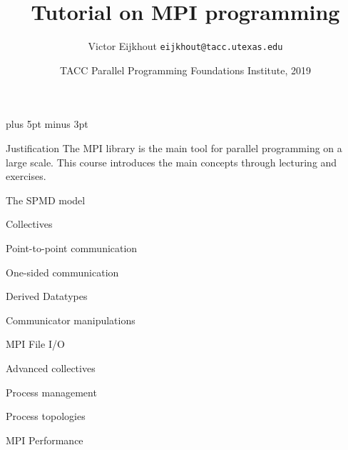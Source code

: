 \documentclass[11pt,headernav]{beamer}
\def\Location{TACC Parallel Programming Foundations Institute, 2019}
\def\TitleExtra{}
\newcounter{tacc}
\begin{document}
\parskip=10pt plus 5pt minus 3pt

\title{Tutorial on MPI programming\TitleExtra}
\author{Victor Eijkhout {\tt eijkhout@tacc.utexas.edu}}
\date{\Location}

\begin{frame}
  \titlepage
\end{frame}

  \begin{frame}{Justification}
    The MPI library is the main tool
    for parallel programming on a large scale.
    This course introduces the main concepts
    through lecturing and exercises.
  \end{frame}

   {The SPMD model}
  

   {Collectives}
  

   {Point-to-point communication}
  

   {One-sided communication}
   

   {Derived Datatypes}
  

   {Communicator manipulations}
  

   {MPI File I/O}
  

   {Advanced collectives}
  

   {Process management}
  

   {Process topologies}
  

   {MPI Performance}
  


\end{document}
